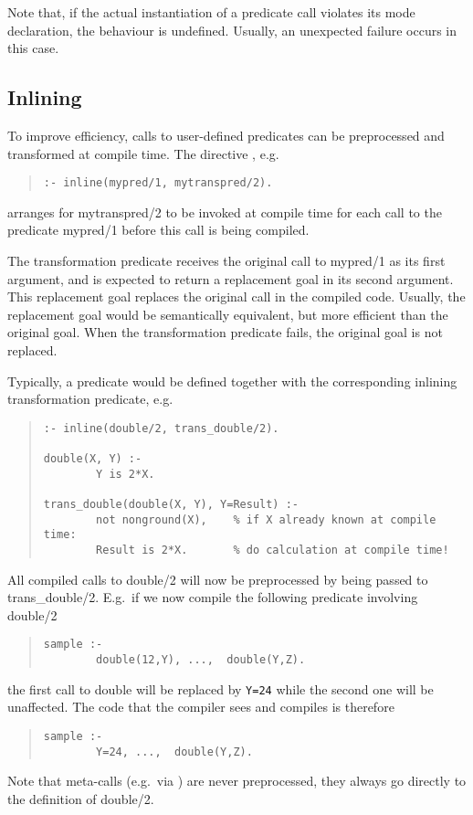 Note that, if the actual instantiation of a predicate call violates
its mode declaration, the behaviour is undefined.
Usually, an unexpected failure occurs in this case.

\subsection{Inlining}
To improve efficiency, calls to user-defined predicates can be
preprocessed and transformed at compile time.  The directive
, e.g.
\begin{quote} \begin{verbatim}
:- inline(mypred/1, mytranspred/2).
\end{verbatim}
\end{quote}
arranges for mytranspred/2 to be invoked at compile time for each 
call to the predicate mypred/1 before this call is being compiled.

The transformation predicate receives the original call to mypred/1
as its first argument, and is expected to return a replacement goal
in its second argument. This replacement goal replaces the original
call in the compiled code. Usually, the replacement goal would be
semantically equivalent, but more efficient than the original goal.
When the transformation predicate fails, the original goal is not
replaced.

Typically, a predicate would be defined together with the corresponding
inlining transformation predicate, e.g.
\begin{quote} \begin{verbatim}
:- inline(double/2, trans_double/2).

double(X, Y) :-
        Y is 2*X.

trans_double(double(X, Y), Y=Result) :-
        not nonground(X),    % if X already known at compile time:
        Result is 2*X.       % do calculation at compile time!
\end{verbatim}
\end{quote}
All compiled calls to double/2 will now be preprocessed by being passed
to trans_double/2.
E.g.\ if we now compile the following predicate involving double/2
\begin{quote} \begin{verbatim}
sample :-
        double(12,Y), ...,  double(Y,Z).
\end{verbatim}
\end{quote}
the first call to double will be replaced by \verb+Y=24+ while the
second one will be unaffected. The code that the compiler sees and
compiles is therefore
\begin{quote} \begin{verbatim}
sample :-
        Y=24, ...,  double(Y,Z).
\end{verbatim}
\end{quote}
Note that meta-calls (e.g.\ via
) are never
preprocessed, they always go directly to the definition of double/2.

